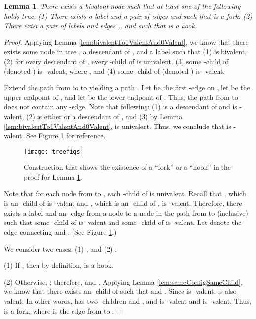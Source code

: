 \documentclass[11pt]{article}
\numberwithin{theorem}{section}
\newtheorem{lemma}[theorem]{Lemma}
\begin{document}
\begin{lemma}\label{lem:hookExists}
 There exists a bivalent node  such that at least one of the following holds true. (1) There exists a label  and a pair of edges  and  such that  is a fork. (2) There exist a pair of labels  and edges ,, and  such that  is a hook. 
\end{lemma}
\begin{proof}
 Applying Lemma \ref{lem:bivalentTo1ValentAnd0Valent}, we know that there exists some node  in tree , a descendant  of , and a label  such that (1)  is bivalent, (2) for every descendant  of , every -child of  is univalent, (3) some -child of  (denoted )
is -valent, where , and (4) some -child of   (denoted )
is -valent.

Extend the path from  to  to  yielding a path . 
Let  be the first -edge on , let  be the upper endpoint of , and let  be the lower endpoint of . Thus, the path from  to  does not contain any -edge.
Note that following:  (1)  is a descendant of  and is -valent, (2)  is either  or a descendant of , and (3) by Lemma \ref{lem:bivalentTo1ValentAnd0Valent},  is univalent. Thus, we conclude that  is -valent. See Figure \ref{fig:hookExistence} for reference.

\begin{figure}[htpb]
 \centering
\texttt{[image: treefigs]}
 \caption{Construction that shows the existence of a ``fork'' or a ``hook'' in the proof for Lemma \ref{lem:hookExists}. }
 \label{fig:hookExistence}
\end{figure}





Note that for each node  from  to , each -child  of  is univalent. 
Recall that , which is an -child of  is -valent and , which is an -child of , is -valent. Therefore, there exists a label  and an -edge  from a node  to a node  in the path from  to  (inclusive) such that some -child  of  is -valent and some -child  of  is -valent. Let  denote the edge connecting  and . (See Figure \ref{fig:hookExistence}.)





We consider two cases: (1) , and (2)  .

(1) If , then by definition,  is a hook. 

(2) Otherwise, ; therefore,  and . Applying Lemma \ref{lem:sameConfigSameChild}, we know that there exists an -child   of  such that  and . Since  is -valent,  is also -valent. In other words,  has two -children  and , and  is -valent and  is -valent. 
Thus,  is a fork, where  is the edge from  to .
\end{proof}
\end{document}
